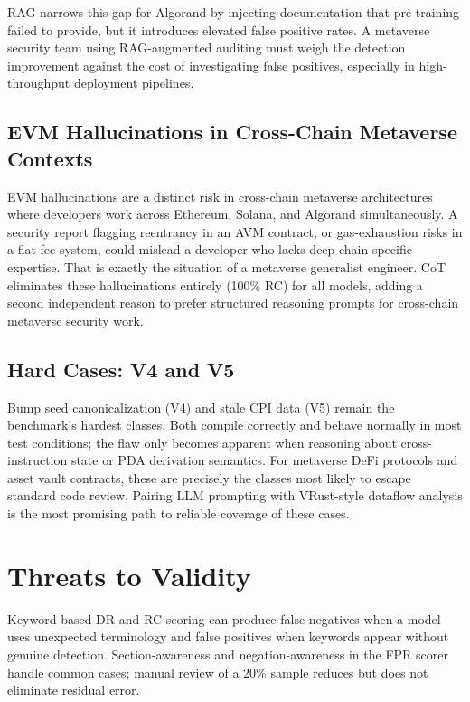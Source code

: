 \documentclass[runningheads]{llncs}
\begin{document}
RAG narrows this gap for Algorand by injecting documentation that pre-training
failed to provide, but it introduces elevated false positive rates.
A metaverse security team using RAG-augmented auditing must weigh the detection
improvement against the cost of investigating false positives, especially in
high-throughput deployment pipelines.

\subsection{EVM Hallucinations in Cross-Chain Metaverse Contexts}

EVM hallucinations are a distinct risk in cross-chain metaverse architectures
where developers work across Ethereum, Solana, and Algorand simultaneously.
A security report flagging reentrancy in an AVM contract, or gas-exhaustion
risks in a flat-fee system, could mislead a developer who lacks deep
chain-specific expertise. That is exactly the situation of a metaverse
generalist engineer.
CoT eliminates these hallucinations entirely (100\% RC) for all models, adding
a second independent reason to prefer structured reasoning prompts for
cross-chain metaverse security work.

\subsection{Hard Cases: V4 and V5}

Bump seed canonicalization (V4) and stale CPI data (V5) remain the benchmark's
hardest classes.
Both compile correctly and behave normally in most test conditions; the flaw
only becomes apparent when reasoning about cross-instruction state or PDA
derivation semantics.
For metaverse DeFi protocols and asset vault contracts, these are precisely the
classes most likely to escape standard code review.
Pairing LLM prompting with VRust-style dataflow analysis is the most promising
path to reliable coverage of these cases.

\section{Threats to Validity}
\label{sec:threats}

Keyword-based DR and RC scoring can produce false negatives when a model uses
unexpected terminology and false positives when keywords appear without genuine
detection.
Section-awareness and negation-awareness in the FPR scorer handle common cases;
manual review of a 20\% sample reduces but does not eliminate residual error.
\end{document}
